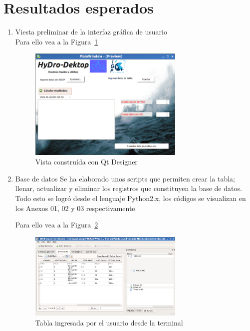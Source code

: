 \documentclass[a4paper,openright,12pt]{report}
\begin{document}
\section{Resultados esperados}

\begin{enumerate}

\item Viesta preliminar de la interfaz gr\'afica de usuario \\
Para ello vea a la Figura~\ref{fig:Vista_preliminar_de_HyDro-Desktop}

\begin{figure}
  \centering
    \includegraphics[width=0.7\textwidth]{screet_preview}
  \caption{Vista constru\'ida con Qt Designer}
  \label{fig:Vista_preliminar_de_HyDro-Desktop}
\end{figure}

\item Base de datos
Se ha elaborado unos scripts que permiten crear la tabla; llenar, actualizar y eliminar los registros que constituyen la base de datos. Todo esto se logró desde el lenguaje Python2.x, los c\'odigos se visualizan en los Anexos 01, 02 y 03 respectivamente.

Para ello vea a la Figura~\ref{fig:Vista_archivo_database_sediments}



\begin{figure}
  \centering
    \includegraphics[width=0.7\textwidth]{screet_database}
  \caption{Tabla ingresada por el usuario desde la terminal}
  \label{fig:Vista_archivo_database_sediments}
\end{figure}


\end{enumerate}
\end{document}
